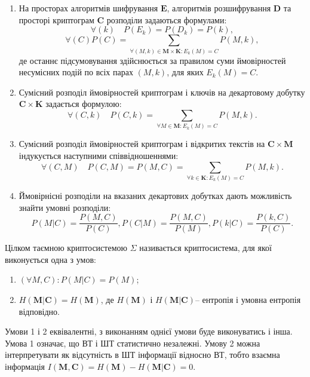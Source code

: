 \begin{enumerate}
    \item На просторах алгоритмів шифрування $\mathbf{E}$, алгоритмів розшифрування $\mathbf{D}$ та
    просторі криптограм $\mathbf{C}$ розподіли задаються формулами:
    $$\forall (k) \quad P(E_k) = P(D_k) = P(k),$$
    $$\forall (C) P(C) = \sum\limits_{\forall (M, k) \in \mathbf{M} \times \mathbf{K}: E_k(M) = C} P(M, k),$$
    де останнє підсумовування здійснюється за правилом суми ймовірностей
    несумісних подій по всіх парах $(M, k)$, для яких $E_k(M) = C$.
    \item Сумісний розподіл ймовірностей криптограм і ключів на декартовому
    добутку $\mathbf{C} \times \mathbf{K}$ задається формулою:
    $$\forall (C, k) \quad P(C, k) = \sum\limits_{\forall M \in \mathbf{M}: E_k(M) = C} P(M, k).$$
    \item Сумісний розподіл ймовірностей криптограм і відкритих текстів на $\mathbf{C} \times \mathbf{M}$ індукується наступними співвідношеннями:
    $$\forall (C, M) \quad P(C, M) = P(M, C) = \sum\limits_{\forall k \in \mathbf{K}: E_k(M) = C} P(M, k).$$
    \item Ймовірнісні розподіли на вказаних декартових добутках дають можливість
    знайти умовні розподіли:
    $$P(M | C) = \frac{P(M, C)}{P(C)}, P(C | M) = \frac{P(M, C)}{P(M)}, P(k | C) = \frac{P(k, C)}{P(C)}.$$
\end{enumerate}

\begin{definition}
    Цілком таємною криптосистемою $\Sigma$ називається
    криптосистема, для якої виконується одна з умов:
    \begin{enumerate}
        \item $(\forall M, C): P(M | C) = P(M)$;
        \item $H(\mathbf{M} | \mathbf{C}) = H(\mathbf{M})$, де $H(\mathbf{M})$ і $H(\mathbf{M} | \mathbf{C})$-- ентропія і умовна ентропія відповідно.
    \end{enumerate}
\end{definition}

\begin{remark}
    Умови 1 і 2 еквівалентні, з виконанням однієї умови буде
    виконуватись і інша. Умова 1 означає, що ВТ і ШТ статистично незалежні.
    Умову 2 можна інтерпретувати як відсутність в ШТ інформації відносно ВТ,
    тобто взаємна інформація
    $I(\mathbf{M}, \mathbf{C}) = H(\mathbf{M}) - H(\mathbf{M} | \mathbf{C}) = 0.$
\end{remark}

